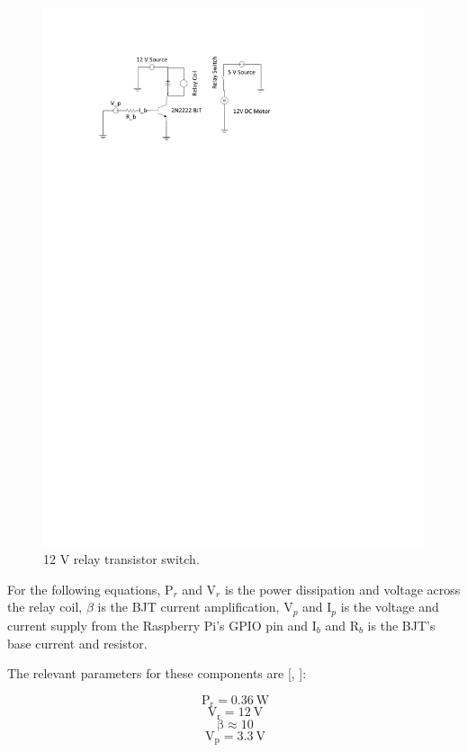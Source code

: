\begin{figure}
\centering
\includegraphics[clip = true, trim = 70 640 0 70, scale=1.2]{relay_switch}
\caption{12 V relay transistor switch.}
\label{fig:relay-switch}
\end{figure}

For the following equations, P$_r$ and V$_r$ is the power dissipation and
voltage across the relay coil, $\beta$ is the BJT current amplification, V$_p$
and I$_p$ is the voltage and current supply from the Raspberry Pi's GPIO pin and
I$_b$ and R$_b$ is the BJT's base current and resistor.

The relevant  parameters for these components are [\cite{manual:relay-specs},
\cite{maunual:transistor-datasheet}]:

\[ \mathrm{\ P_{r}} = 0.36\mathrm{\ W}\]
\[ \mathrm{\ V_{r}} = 12\mathrm{\ V}\]
\[ \mathrm{\ \beta} \approx 10\]
\[ \mathrm{\ V_{p}} = 3.3\mathrm{\ V}\]

